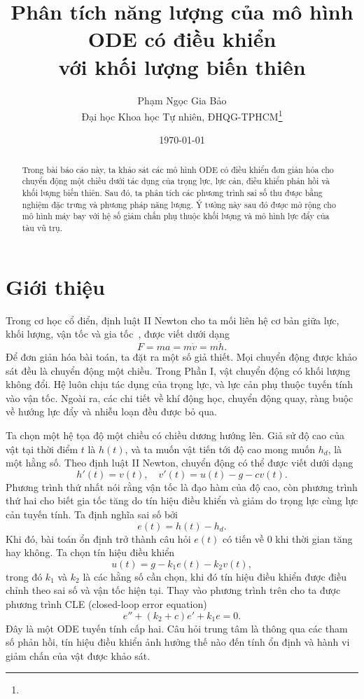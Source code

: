 ﻿\documentclass[12pt]{article}
\title{\Large Phân tích năng lượng của mô hình ODE có điều khiển\\ với khối lượng biến thiên}
\author{
  \normalsize Phạm Ngọc Gia Bảo\\
  \normalsize Đại học Khoa học Tự nhiên, ĐHQG-TPHCM\footnote{\authorinfo}
}
\date{\normalsize\today}
\begin{document}
\maketitle
\begin{abstract}
Trong bài báo cáo này, ta khảo sát các mô hình ODE có điều khiển đơn giản hóa cho chuyển động một chiều dưới tác dụng của trọng lực, lực cản, điều khiển phản hồi và khối lượng biến thiên.
Sau đó, ta phân tích các phương trình sai số thu được bằng nghiệm đặc trưng và phương pháp năng lượng.
Ý tưởng này sau đó được mở rộng cho mô hình máy bay với hệ số giảm chấn phụ thuộc khối lượng và mô hình lực đẩy của tàu vũ trụ.
\end{abstract}
\tableofcontents

\section*{Giới thiệu}
Trong cơ học cổ điển, định luật II Newton cho ta mối liên hệ cơ bản giữa lực, khối lượng, vận tốc và gia tốc~\cite{arnold_classical_mechanics}, được viết dưới dạng
\[
 F = ma = m\dot v = m\ddot h.
\]
Để đơn giản hóa bài toán, ta đặt ra một số giả thiết. Mọi chuyển động được khảo sát đều là chuyển động một chiều. Trong Phần I, vật chuyển động có khối lượng không đổi. Hệ luôn chịu tác dụng của trọng lực, và lực cản phụ thuộc tuyến tính vào vận tốc. Ngoài ra, các chi tiết về khí động học, chuyển động quay, ràng buộc về hướng lực đẩy và nhiễu loạn đều được bỏ qua. 

Ta chọn một hệ tọa độ một chiều có chiều dương hướng lên. Giả sử độ cao của vật tại thời điểm $t$ là $h(t)$, và ta muốn vật tiến tới độ cao mong muốn $h_d$, là một hằng số. Theo định luật II Newton, chuyển động có thể được viết dưới dạng
\[
 h'(t) = v(t),\quad v'(t) = u(t) - g - cv(t).
\]
Phương trình thứ nhất nói rằng vận tốc là đạo hàm của độ cao, còn phương trình thứ hai cho biết gia tốc tăng do tín hiệu điều khiển và giảm do trọng lực cùng lực cản tuyến tính. Ta định nghĩa sai số bởi
\[
 e(t) = h(t) - h_d.
\]
Khi đó, bài toán ổn định trở thành câu hỏi $e(t)$ có tiến về 0 khi thời gian tăng hay không. Ta chọn tín hiệu điều khiển
\[
 u(t) = g - k_1e(t) - k_2v(t),
\]
trong đó $k_1$ và $k_2$ là các hằng số cần chọn, khi đó tín hiệu điều khiển được điều chỉnh theo sai số và vận tốc hiện tại. Thay vào phương trình trên cho ta được phương trình CLE (closed-loop error equation)
\[
 e'' + (k_2 + c)e' + k_1e = 0.
\]
Đây là một ODE tuyến tính cấp hai. Câu hỏi trung tâm là thông qua các tham số phản hồi, tín hiệu điều khiển ảnh hưởng thế nào đến tính ổn định và hành vi giảm chấn của vật được khảo sát.
\end{document}
